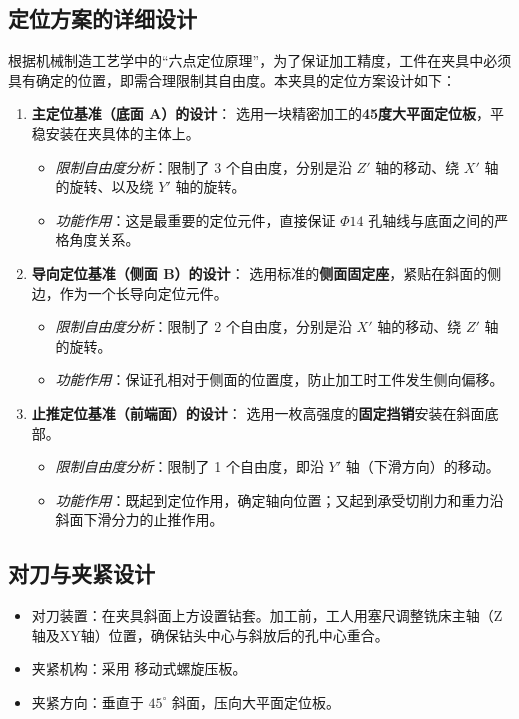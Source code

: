 \documentclass[withoutpreface,bwprint]{cumcmthesis}
\begin{document}
\subsection{定位方案的详细设计}
根据机械制造工艺学中的“六点定位原理”，为了保证加工精度，工件在夹具中必须具有确定的位置，即需合理限制其自由度。本夹具的定位方案设计如下：

\begin{enumerate}
    \item \textbf{主定位基准（底面 A）的设计}：
    选用一块精密加工的\textbf{45度大平面定位板}，平稳安装在夹具体的主体上。
    \begin{itemize}
        \item \textit{限制自由度分析}：限制了 3 个自由度，分别是沿 $Z'$ 轴的移动、绕 $X'$ 轴的旋转、以及绕 $Y'$ 轴的旋转。
        \item \textit{功能作用}：这是最重要的定位元件，直接保证 $\Phi14$ 孔轴线与底面之间的严格角度关系。
    \end{itemize}

    \item \textbf{导向定位基准（侧面 B）的设计}：
    选用标准的\textbf{侧面固定座}，紧贴在斜面的侧边，作为一个长导向定位元件。
    \begin{itemize}
        \item \textit{限制自由度分析}：限制了 2 个自由度，分别是沿 $X'$ 轴的移动、绕 $Z'$ 轴的旋转。
        \item \textit{功能作用}：保证孔相对于侧面的位置度，防止加工时工件发生侧向偏移。
    \end{itemize}

    \item \textbf{止推定位基准（前端面）的设计}：
    选用一枚高强度的\textbf{固定挡销}安装在斜面底部。
    \begin{itemize}
        \item \textit{限制自由度分析}：限制了 1 个自由度，即沿 $Y'$ 轴（下滑方向）的移动。
        \item \textit{功能作用}：既起到定位作用，确定轴向位置；又起到承受切削力和重力沿斜面下滑分力的止推作用。
    \end{itemize}
\end{enumerate}

\subsection{对刀与夹紧设计}
\begin{itemize}
    \item 对刀装置：在夹具斜面上方设置钻套。加工前，工人用塞尺调整铣床主轴（Z轴及XY轴）位置，确保钻头中心与斜放后的孔中心重合。
    \item 夹紧机构：采用 移动式螺旋压板。
    \item 夹紧方向：垂直于 $45^\circ$ 斜面，压向大平面定位板。
\end{itemize}
\end{document}
